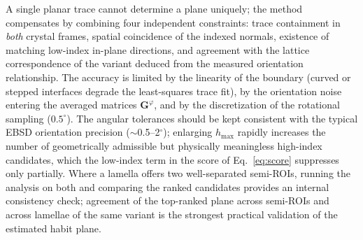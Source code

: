 \documentclass[11pt,a4paper]{article}
\newcommand{\mat}[1]{\mathbf{#1}}
\begin{document}
A single planar trace cannot determine a plane uniquely; the method compensates by combining four independent constraints: trace containment in \emph{both} crystal frames, spatial coincidence of the indexed normals, existence of matching low-index in-plane directions, and agreement with the lattice correspondence of the variant deduced from the measured orientation relationship. The accuracy is limited by the linearity of the boundary (curved or stepped interfaces degrade the least-squares trace fit), by the orientation noise entering the averaged matrices $\mat G^{\varphi}$, and by the discretization of the rotational sampling ($0.5^\circ$). The angular tolerances should be kept consistent with the typical EBSD orientation precision ($\sim$0.5--2$^\circ$); enlarging $h_{\max}$ rapidly increases the number of geometrically admissible but physically meaningless high-index candidates, which the low-index term in the score of Eq.~\eqref{eq:score} suppresses only partially. Where a lamella offers two well-separated semi-ROIs, running the analysis on both and comparing the ranked candidates provides an internal consistency check; agreement of the top-ranked plane across semi-ROIs and across lamellae of the same variant is the strongest practical validation of the estimated habit plane.
\end{document}
